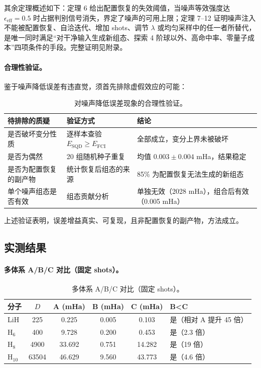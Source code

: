 \documentclass[UTF8,12pt,a4paper]{ctexart}
\begin{document}
其余定理概述如下：定理 6 给出配置恢复的失效阈值，当噪声等效强度达 $\epsilon_{\text{eff}}=0.5$ 时占据判别信号消失，界定了噪声的可用上限；定理 7--12 证明噪声注入不能被配置恢复、自洽迭代、增加 shots、调节 $\lambda$ 或均匀采样中的任一者所替代，是唯一同时满足``对干净输入生成新组态、探索 4 阶球以外、高命中率、零量子成本''四项条件的手段。完整证明见附录。

\paragraph{合理性验证。} 鉴于噪声降低误差有违直觉，须首先排除虚假效应的可能：

\begin{table}[H]
\centering
\caption{对噪声降低误差现象的合理性验证。}
\begin{tabular}{p{4.5cm}p{4cm}p{5cm}}
\toprule
待排除的质疑 & 验证方式 & 结论 \\
\midrule
是否破坏变分性质 & 逐样本查验 $E_{\text{SQD}}\ge E_{\text{FCI}}$ & 全部成立，变分上界未被破坏 \\
是否为偶然 & 20 组随机种子重复 & 均值 $0.003\pm0.004$ mHa，结果稳定 \\
是否为配置恢复的副产物 & 统计恢复后组态的来源 & 85\% 为配置恢复无法生成的新组态 \\
单个噪声组态是否有效 & 组态贡献分析 & 单独无效（2028 mHa），组合后有效（0.005 mHa） \\
\bottomrule
\end{tabular}
\end{table}

上述验证表明，误差增益真实、可复现，且非配置恢复的副产物，方法成立。

\subsection{实测结果}

\paragraph{多体系 A/B/C 对比（固定 shots）。}

\begin{table}[H]
\centering
\caption{多体系 A/B/C 对比（固定 shots）。}
\begin{tabular}{lccccl}
\toprule
分子 & $D$ & A (mHa) & B (mHa) & C (mHa) & B<C \\
\midrule
LiH & 225 & 0.225 & 0.005 & 0.103 & 是（相对 A 提升 45 倍） \\
H$_6$ & 400 & 9.728 & 0.200 & 0.453 & 是（2.3 倍） \\
H$_8$ & 4900 & 33.692 & 0.751 & 14.282 & 是（19 倍） \\
H$_{10}$ & 63504 & 46.629 & 9.560 & 43.773 & 是（4.6 倍） \\
\bottomrule
\end{tabular}
\end{table}
\end{document}
